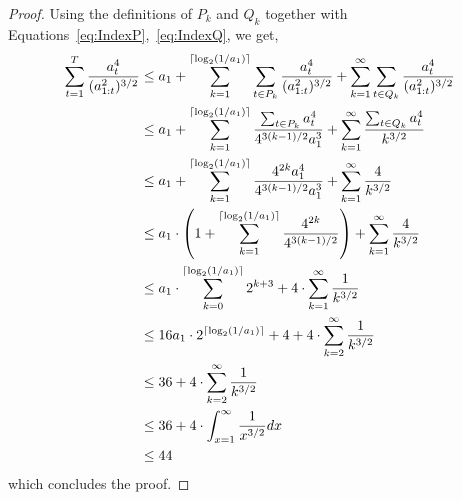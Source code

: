 \begin{proof}
Using the definitions  of $P_k$ and $Q_k$ together with Equations~\eqref{eq:IndexP},~\eqref{eq:IndexQ}, we get,
\begin{align*}
\sum_{t=1}^T \frac{a_t^4}{(a^2_{1:t})^{3/2}} & \leq a_1 + \sum_{k=1}^{\lceil\log_2(1/a_1)\rceil} \sum_{t \in P_k} \frac{a_t^4}{(a^2_{1:t})^{3/2}} +\sum_{k=1}^{\infty} \sum_{t \in Q_k} \frac{a_t^4}{(a^2_{1:t})^{3/2}} \\
&\leq
 a_1 + \sum_{k=1}^{\lceil\log_2(1/a_1)\rceil} \frac{\sum_{t\in P_k} a_t^4}{4^{3(k-1)/2} a_1^3} 
+ \sum_{k=1}^{\infty}  \frac{\sum_{t\in Q_k} a_t^4}{k^{3/2}} \\
&\leq
 a_1 + \sum_{k=1}^{\lceil\log_2(1/a_1)\rceil} \frac{4^{2k}a_1^4}{4^{3(k-1)/2} a_1^3} 
+ \sum_{k=1}^{\infty}  \frac{4}{k^{3/2}} \\
&\leq
a_1 \cdot  \left( 1 +\sum_{k=1}^{\lceil\log_2(1/a_1)\rceil} \frac{ 4^{2k}}{4^{3(k-1)/2} } \right)
+  \sum_{k=1}^{\infty} \frac{4}{k^{3/2}} \\
&\leq
a_1 \cdot   \sum_{k=0}^{\lceil\log_2(1/a_1)\rceil} 2^{k+3} 
+ 4 \cdot \sum_{k=1}^{\infty} \frac{1}{k^{3/2}} \\
&\leq
16a_1 \cdot 2^{\lceil\log_2(1/a_1)\rceil} 
+ 4 + 4 \cdot \sum_{k=2}^{\infty} \frac{1}{k^{3/2}} \\
&\leq
 36 + 4 \cdot \sum_{k=2}^{\infty} \frac{1}{k^{3/2}} \\
&\leq
36
+4 \cdot \int_{x=1}^\infty \frac{1}{x^{3/2}}dx \\
&\leq
44
\end{align*}
which concludes the proof.
\end{proof}



